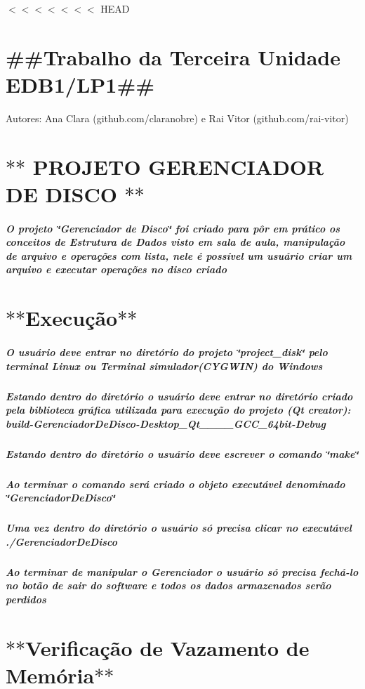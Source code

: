 $<$$<$$<$$<$$<$$<$$<$ H\+E\+A\+D \section*{\#\#\+Trabalho da Terceira Unidade E\+D\+B1/\+L\+P1\#\#}

Autores\+: Ana Clara (github.\+com/claranobre) e Rai Vitor (github.\+com/rai-\/vitor)

\section*{$\ast$$\ast$ P\+R\+O\+J\+E\+T\+O G\+E\+R\+E\+N\+C\+I\+A\+D\+O\+R D\+E D\+I\+S\+C\+O $\ast$$\ast$}

\subparagraph*{O projeto \char`\"{}\+Gerenciador de Disco\char`\"{} foi criado para pôr em prático os conceitos de Estrutura de Dados visto em sala de aula, manipulação de arquivo e operações com lista, nele é possível um usuário criar um arquivo e executar operações no disco criado}

\section*{$\ast$$\ast$\+Execução$\ast$$\ast$}

\subparagraph*{O usuário deve entrar no diretório do projeto \char`\"{}project\+\_\+disk\char`\"{} pelo terminal Linux ou Terminal simulador(\+C\+Y\+G\+W\+I\+N) do Windows}

\subparagraph*{Estando dentro do diretório o usuário deve entrar no diretório criado pela biblioteca gráfica utilizada para execução do projeto (Qt creator)\+: build-\/\+Gerenciador\+De\+Disco-\/\+Desktop\+\_\+\+Qt\+\_\+\_\+\_\+\_\+\+G\+C\+C\+\_\+64bit-\/\+Debug }

\subparagraph*{Estando dentro do diretório o usuário deve escrever o comando \char`\"{}make\char`\"{}}

\subparagraph*{Ao terminar o comando será criado o objeto executável denominado \char`\"{}\+Gerenciador\+De\+Disco\char`\"{}}

\subparagraph*{Uma vez dentro do diretório o usuário só precisa clicar no executável ./\+Gerenciador\+De\+Disco}

\subparagraph*{Ao terminar de manipular o Gerenciador o usuário só precisa fechá-\/lo no botão de sair do software e todos os dados armazenados serão perdidos}

\section*{$\ast$$\ast$\+Verificação de Vazamento de Memória$\ast$$\ast$ }

